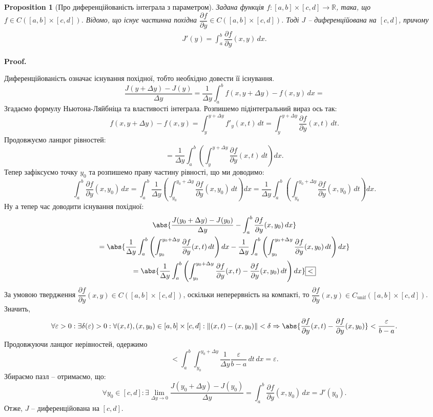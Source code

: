 \documentclass[a4paper, 10pt]{article}
\makeatletter
\def\departial#1#2{\dfrac{\partial {#1}}{\partial {#2}}}
\def\huge{\displaystyle}
\theoremstyle{theoremdd}
\theoremstyle{theoremdd}
\theoremstyle{theoremdd}
\theoremstyle{theoremdd}
\theoremstyle{theoremdd}
\theoremstyle{theoremdd}
\newtheorem{proposition}[theorem]{Proposition}
\theoremstyle{theoremdd}
\theoremstyle{theoremdd}
\theoremstyle{theoremdd}
\renewenvironment{proof}[1][Proof.\\]{\par
\pushQED{\hfill \qed}%
\normalfont \topsep6\p@\@plus6\p@\relax
\trivlist
\item\relax
{\bfseries
#1\@addpunct{.}}\hspace\labelsep\ignorespaces
}{%
\popQED\endtrivlist\@endpefalse
}
\makeatother
\begin{document}
\begin{proposition}[Про диференційованість інтеграла з параметром]
\label{differentiability_of_parametric_integral}
Задана функція $f \colon [a,b] \times [c,d] \to \mathbb{R}$, така, що $f \in C([a,b] \times [c,d])$. Відомо, що існує частинна похідна $\departial{f}{y} \in C([a,b] \times [c,d])$. Тоді $J$ -- диференційована на $[c,d]$, причому 
\begin{align*}
J'(y) = \int_a^b \departial{f}{y}(x,y)\,dx.
\end{align*}
\end{proposition}

\begin{proof}
Диференційованість означає існування похідної, тобто необхідно довести її існування.
\[
\dfrac{J(y+\Delta y) - J(y)}{\Delta y} = \dfrac{1}{\Delta y}  \int_a^b f(x,y+\Delta y) - f(x,y)\,dx \boxed{=}
\]
Згадаємо формулу Ньютона-Ляйбніца та властивості інтеграла. Розпишемо підінтегральний вираз ось так:\\
\[
f(x,y+\Delta y) - f(x,y) = \int_y^{y+\Delta y} f'_y(x,t)\,dt = \int_y^{y+\Delta y} \departial{f}{y}(x,t)\,dt.
\]
Продовжуємо ланцюг рівностей:
\[
\boxed{=} \dfrac{1}{\Delta y} \int_a^b \left( \int_y^{y+\Delta y} \departial{f}{y}(x,t)\,dt \right)dx.
\]
Тепер зафіксуємо точку $y_0$ та розпишемо праву частину рівності, що ми доводимо:
\[
\int_a^b \departial{f}{y}(x,y_0)\,dx = \int_a^b \dfrac{1}{\Delta y} \left( \int_{y_0}^{y_0+\Delta y} \departial{f}{y}(x,y_0) \,dt \right)dx = \dfrac{1}{\Delta y} \int_a^b \left( \int_{y_0}^{y_0+\Delta y} \departial{f}{y}(x,y_0) \,dt \right)dx.
\]
Ну а тепер час доводити існування похідної:
\begin{multline*}
\abs{\dfrac{J(y_0+\Delta y) - J(y_0)}{\Delta y} - \huge\int_a^b \departial{f}{y}(x,y_0)\,dx} \\
 = \abs{\dfrac{1}{\Delta y} \int_a^b \left( \int_{y_0}^{y_0+\Delta y} \departial{f}{y}(x,t)\,dt \right)dx - \dfrac{1}{\Delta y} \int_a^b \left( \int_{y_0}^{y_0+\Delta y} \departial{f}{y}(x,y_0) \,dt \right)dx} \\
= \abs{\dfrac{1}{\Delta y} \int_a^b \left( \int_{y_0}^{y_0 + \Delta y} \departial{f}{y}(x,t) - \departial{f}{y}(x,y_0) \,dt \right)dx} \boxed{<}
\end{multline*}
За умовою твердження $\departial{f}{y}(x,y) \in C([a,b] \times [c,d])$, оскільки неперервність на компакті, то $\departial{f}{y}(x,y) \in C_{\text{unif}}([a,b] \times [c,d])$. Значить,
\[
\forall \varepsilon > 0: \exists \delta(\varepsilon) > 0: \forall (x,t),(x,y_0) \in [a,b]\times [c,d]: \|(x,t)-(x,y_0)\| < \delta \Rightarrow \abs{\departial{f}{y}(x,t) - \departial{f}{y}(x,y_0)} < \dfrac{\varepsilon}{b-a}.
\]
Продовжуючи ланцюг нерівностей, одержимо
\[
\boxed{<} \int_a^b \int_{y_0}^{y_0+\Delta y} \dfrac{1}{\Delta y} \dfrac{\varepsilon}{b-a} \,dt \,dx = \varepsilon.
\]
Збираємо пазл -- отримаємо, що:
\[
\forall y_0 \in [c,d]: \exists \lim_{\Delta y \to 0} \dfrac{J(y_0+\Delta y)-J(y_0)}{\Delta y} = \int_a^b \departial{f}{y}(x,y_0)\,dx = J'(y_0).
\]
Отже, $J$ -- диференційована на $[c,d]$.
\end{proof}
\end{document}
